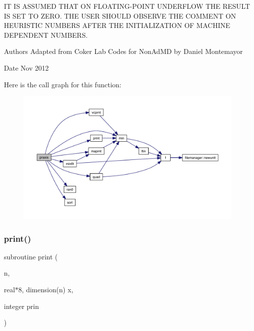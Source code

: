 IT IS A\+S\+S\+U\+M\+ED T\+H\+AT ON F\+L\+O\+A\+T\+I\+N\+G-\/\+P\+O\+I\+NT U\+N\+D\+E\+R\+F\+L\+OW T\+HE R\+E\+S\+U\+LT IS S\+ET TO Z\+E\+RO. T\+HE U\+S\+ER S\+H\+O\+U\+LD O\+B\+S\+E\+R\+VE T\+HE C\+O\+M\+M\+E\+NT ON H\+E\+U\+R\+I\+S\+T\+IC N\+U\+M\+B\+E\+RS A\+F\+T\+ER T\+HE I\+N\+I\+T\+I\+A\+L\+I\+Z\+A\+T\+I\+ON OF M\+A\+C\+H\+I\+NE D\+E\+P\+E\+N\+D\+E\+NT N\+U\+M\+B\+E\+RS. \begin{DoxyAuthor}{Authors}
Adapted from Coker Lab Codes for Non\+Ad\+MD by Daniel Montemayor 
\end{DoxyAuthor}
\begin{DoxyDate}{Date}
Nov 2012 
\end{DoxyDate}
Here is the call graph for this function\+:\nopagebreak
\begin{figure}[H]
\begin{center}
\leavevmode
\includegraphics[width=350pt]{praxis_8f_ad363b84325df8361d0bce4a2456bef23_cgraph}
\end{center}
\end{figure}
\mbox{\label{praxis_8f_ac10ca39b9214d2a1ff4701ab237bf2a9}} 
\subsubsection{\texorpdfstring{print()}{print()}}
{\footnotesize\ttfamily subroutine print (\begin{DoxyParamCaption}\item[{}]{n,  }\item[{real$\ast$8, dimension(n)}]{x,  }\item[{integer}]{prin }\end{DoxyParamCaption})}

